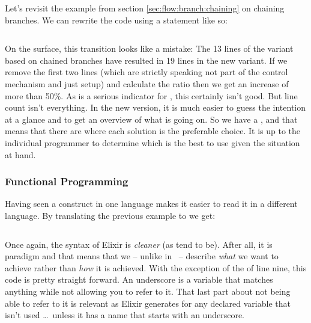 Let's revisit the example from section \ref{sec:flow:branch:chaining} on chaining branches. We can rewrite the code using a  statement like so:

\inputminted[linenos]{csharp}{../src/csharp/flow_branch/switch/Program.cs}

On the surface, this transition looks like a mistake: The 13 lines of the variant based on chained branches have resulted in 19 lines in the new variant. If we remove the first two lines (which are strictly speaking not part of the control mechanism and just setup) and calculate the ratio then we get an increase of more than 50\%. As  is a serious indicator for , this certainly isn't good. But line count isn't everything. In the new version, it is much easier to guess the intention at a glance and to get an overview of what is going on. So we have a , and that means that there are  where each solution is the preferable choice. It is up to the individual programmer to determine which is the best  to use given the situation at hand.

\subsubsection{Functional Programming}


Having seen a construct in one language makes it easier to read it in a different language. By translating the previous example to  we get:

\inputminted[linenos,firstline=3,firstnumber=1]{elixir}{../src/elixir/flow_branch/switch/switch.exs}

Once again, the syntax of Elixir is \textsl{cleaner} (as  tend to be). After all, it is  paradigm and that means that we -- unlike in \csharp\ -- describe \textsl{what} we want to achieve rather than \textsl{how} it is achieved. With the exception of the  of line nine, this code is pretty straight forward. An underscore is a variable that matches anything while not allowing you to refer to it. That last part about not being able to refer to it is relevant as Elixir generates  for any declared variable that isn't used \ldots\ unless it has a name that starts with an underscore.

